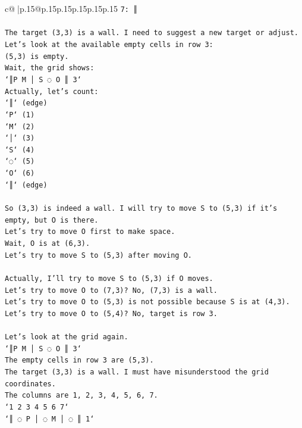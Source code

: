 \documentclass{article}
\begin{document}
{\begin{supertabular}{c@{$\;$}|p{.15\linewidth}@{}p{.15\linewidth}p{.15\linewidth}p{.15\linewidth}p{.15\linewidth}p{.15\linewidth}}
{{{\texttt{7: ║} \\
\\ 
\texttt{The target (3,3) is a wall. I need to suggest a new target or adjust.} \\
\texttt{Let's look at the available empty cells in row 3:} \\
\texttt{(5,3) is empty.} \\
\texttt{Wait, the grid shows:} \\
\texttt{`║P M │ S ◌ O ║ 3`} \\
\texttt{Actually, let's count:} \\
\texttt{`║` (edge)} \\
\texttt{`P` (1)} \\
\texttt{`M` (2)} \\
\texttt{`│` (3)} \\
\texttt{`S` (4)} \\
\texttt{`◌` (5)} \\
\texttt{`O` (6)} \\
\texttt{`║` (edge)} \\
\\ 
\texttt{So (3,3) is indeed a wall. I will try to move S to (5,3) if it's empty, but O is there.} \\
\texttt{Let's try to move O first to make space.} \\
\texttt{Wait, O is at (6,3).} \\
\texttt{Let's try to move S to (5,3) after moving O.} \\
\\ 
\texttt{Actually, I'll try to move S to (5,3) if O moves.} \\
\texttt{Let's try to move O to (7,3)? No, (7,3) is a wall.} \\
\texttt{Let's try to move O to (5,3) is not possible because S is at (4,3).} \\
\texttt{Let's try to move O to (5,4)? No, target is row 3.} \\
\\ 
\texttt{Let's look at the grid again.} \\
\texttt{`║P M │ S ◌ O ║ 3`} \\
\texttt{The empty cells in row 3 are (5,3).} \\
\texttt{The target (3,3) is a wall. I must have misunderstood the grid coordinates.} \\
\texttt{The columns are 1, 2, 3, 4, 5, 6, 7.} \\
\texttt{`1 2 3 4 5 6 7`} \\
\texttt{`║ ◌ P │ ◌ M │ ◌ ║ 1`} \\
}}}
\end{supertabular}}
\end{document}
